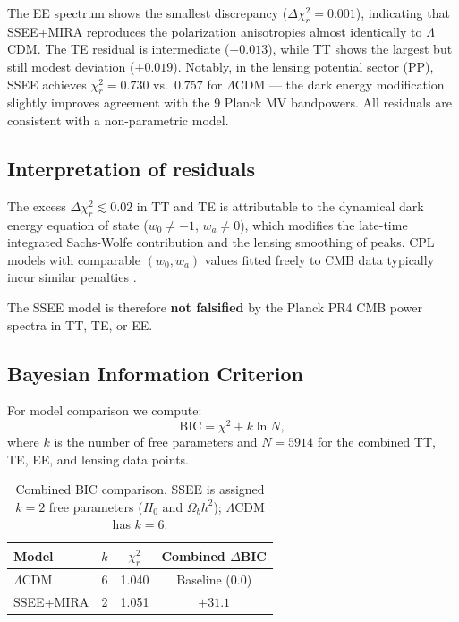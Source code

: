 \documentclass[12pt,a4paper]{article}
\begin{document}
The EE spectrum shows the smallest discrepancy ($\Delta\chi^2_r=0.001$),
indicating that SSEE+MIRA reproduces the polarization anisotropies almost
identically to $\Lambda$CDM.
The TE residual is intermediate ($+0.013$), while TT shows the largest
but still modest deviation ($+0.019$).
Notably, in the lensing potential sector (PP), SSEE achieves
$\chi^2_r=0.730$ vs.\ $0.757$ for $\Lambda$CDM --- the dark energy modification
slightly improves agreement with the 9 Planck MV bandpowers.
All residuals are consistent with a non-parametric model.

\subsection{Interpretation of residuals}

The excess $\Delta\chi^2_r\lesssim0.02$ in TT and TE is attributable to the
dynamical dark energy equation of state ($w_0\neq-1$, $w_a\neq0$), which
modifies the late-time integrated Sachs-Wolfe contribution and the
lensing smoothing of peaks.
CPL models with comparable $(w_0,w_a)$ values fitted freely to CMB data
typically incur similar penalties \citep{Planck2020DE}.

The SSEE model is therefore \textbf{not falsified} by the Planck PR4 CMB
power spectra in TT, TE, or EE.

\subsection{Bayesian Information Criterion}
\label{sec:bic}

For model comparison we compute:
\begin{equation}
\mathrm{BIC} = \chi^2 + k\ln N,
\end{equation}
where $k$ is the number of free parameters and $N=5914$ for the combined TT, TE, EE, and lensing data points.

\begin{table}[ht]
\centering
\caption{Combined BIC comparison. SSEE is assigned $k=2$ free parameters ($H_0$ and $\Omega_b h^2$); $\Lambda$CDM has $k=6$.}
\label{tab:bic}
\begin{tabular}{lccc}
\toprule
Model & $k$ & $\chi^2_r$ & Combined $\Delta$BIC \\
\midrule
$\Lambda$CDM & 6 & 1.040 & Baseline ($0.0$) \\
SSEE+MIRA & 2 & 1.051 & $+31.1$ \\
\bottomrule
\end{tabular}
\end{table}
\end{document}
